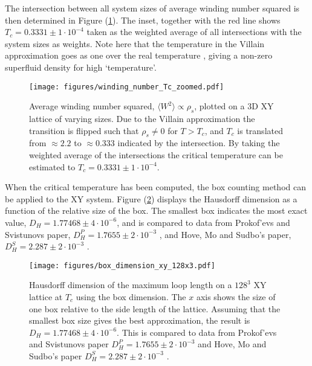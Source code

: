 \newpage

The intersection between all system sizes of average winding number squared is then determined in Figure (\ref{fig:results_windingnumberTcZoomed}). The inset, together with the red line shows $T_c = 0.3331 \pm 1 \cdot 10^{-4}$ taken as the weighted average of all intersections with the system sizes as weights. Note here that the temperature in the Villain approximation goes as one over the real temperature \cite{Villain:VillainOriginalPaper}, giving a non-zero superfluid density for high `temperature'.

\begin{figure}[h!]
    \centering
        \texttt{[image: figures/winding\_number\_Tc\_zoomed.pdf]}
    \caption{Average winding number squared, $\langle W^2 \rangle \propto \rho_s$, plotted on a 3D XY lattice of varying sizes. Due to the Villain approximation the transition is flipped such that $\rho_s \neq 0$ for $T > T_c$, and $T_c$ is translated from $\approx 2.2$ \cite{Gottlob:CritBehaviour3DXY} to $\approx 0.333$ indicated by the intersection. By taking the weighted average of the intersections the critical temperature can be estimated to $T_c = 0.3331 \pm 1 \cdot 10^{-4}$.}
    \label{fig:results_windingnumberTcZoomed}
\end{figure}

\newpage

When the critical temperature has been computed, the box counting method can be applied to the XY system. Figure (\ref{fig:results_boxdimension_xy}) displays the Hausdorff dimension as a function of the relative size of the box. The smallest box indicates the most exact value, $D_H = 1.77468 \pm 4 \cdot 10^{-6}$, and is compared to data from Prokof'evs and Svistunovs paper, $D_H^P = 1.7655 \pm 2 \cdot 10^{-3}$ \cite{Prokofev:comment_on_hove_hausdorff_crit_fluct}, and Hove, Mo and Sudbo's paper, $D_H^S = 2.287 \pm 2 \cdot 10^{-3}$ \cite{Hove:hausdorff_crit_fluctuations}.

\begin{figure}[h!]
    \centering
        \texttt{[image: figures/box\_dimension\_xy\_128x3.pdf]}
    \caption{Hausdorff dimension of the maximum loop length on a $128^3$ XY lattice at $T_c$ using the box dimension. The $x$ axis shows the size of one box relative to the side length of the lattice. Assuming that the smallest box size gives the best approximation, the result is $D_H = 1.77468 \pm 4 \cdot 10^{-6}$. This is compared to data from Prokof'evs and Svistunovs paper $D_H^P = 1.7655 \pm 2 \cdot 10^{-3}$ \cite{Prokofev:comment_on_hove_hausdorff_crit_fluct} and Hove, Mo and Sudbo's paper $D_H^S = 2.287 \pm 2 \cdot 10^{-3}$ \cite{Hove:hausdorff_crit_fluctuations}.}
    \label{fig:results_boxdimension_xy}
\end{figure}

